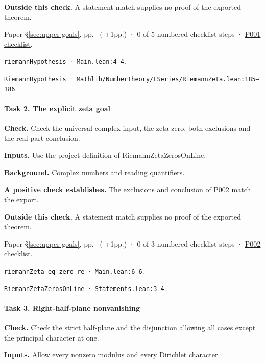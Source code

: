 \textbf{Outside this check.} A statement match supplies no proof of the exported theorem.

Paper \S\ref{sec:upper-goals}, pp.\ \pageref{pn:P001} (\number\numexpr{}-+1\relax pp.) · 0 of 5 numbered checklist steps · \href{https://github.com/GunheeC/rh-lean-verification-atlas/blob/v0.1.0/units/P001.check.md}{P001 checklist}.

\nolinkurl{riemannHypothesis} · \nolinkurl{Main.lean:4–4}.

\nolinkurl{RiemannHypothesis} · \nolinkurl{Mathlib/NumberTheory/LSeries/RiemannZeta.lean:185–186}.

\paragraph{Task 2. The explicit zeta goal}\label{v7:task-2}

\textbf{Check.} Check the universal complex input, the zeta zero, both exclusions and the real-part conclusion.

\textbf{Inputs.} Use the project definition of RiemannZetaZerosOnLine.

\textbf{Background.} Complex numbers and reading quantifiers.

\textbf{A positive check establishes.} The exclusions and conclusion of P002 match the export.

\textbf{Outside this check.} A statement match supplies no proof of the exported theorem.

Paper \S\ref{sec:upper-goals}, pp.\ \pageref{pn:P002} (\number\numexpr{}-+1\relax pp.) · 0 of 3 numbered checklist steps · \href{https://github.com/GunheeC/rh-lean-verification-atlas/blob/v0.1.0/units/P002.check.md}{P002 checklist}.

\nolinkurl{riemannZeta_eq_zero_re} · \nolinkurl{Main.lean:6–6}.

\nolinkurl{RiemannZetaZerosOnLine} · \nolinkurl{Statements.lean:3–4}.

\paragraph{Task 3. Right-half-plane nonvanishing}\label{v7:task-3}

\textbf{Check.} Check the strict half-plane and the disjunction allowing all cases except the principal character at one.

\textbf{Inputs.} Allow every nonzero modulus and every Dirichlet character.

